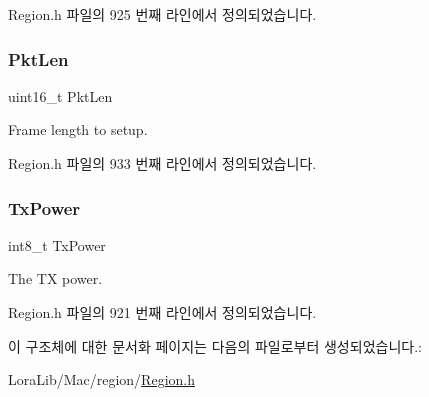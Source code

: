 Region.\+h 파일의 925 번째 라인에서 정의되었습니다.

\mbox{\label{structs_tx_config_params_aff9de7b29c2d9ebf3fa963f2ba09c121}} 
\subsubsection{\texorpdfstring{Pkt\+Len}{PktLen}}
{\footnotesize\ttfamily uint16\+\_\+t Pkt\+Len}

Frame length to setup. 

Region.\+h 파일의 933 번째 라인에서 정의되었습니다.

\mbox{\label{structs_tx_config_params_a037b4f849fa8ed4aa1d3c58aef2b28ec}} 
\subsubsection{\texorpdfstring{Tx\+Power}{TxPower}}
{\footnotesize\ttfamily int8\+\_\+t Tx\+Power}

The TX power. 

Region.\+h 파일의 921 번째 라인에서 정의되었습니다.



이 구조체에 대한 문서화 페이지는 다음의 파일로부터 생성되었습니다.\+:\begin{DoxyCompactItemize}
\item 
Lora\+Lib/\+Mac/region/\mbox{\hyperlink{_region_8h}{Region.\+h}}\end{DoxyCompactItemize}
